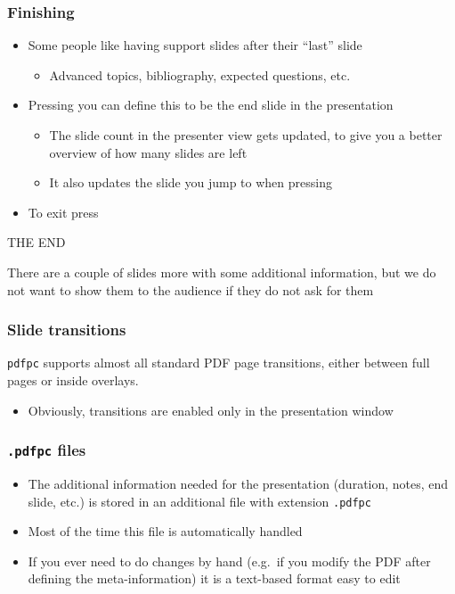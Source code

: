 \documentclass{beamer}
\newcommand{\singleitem}[1]{\begin{itemize}\item #1\end{itemize}}
\newcommand{\pdfpc}{\texttt{pdfpc}\xspace}
\newcommand{\opt}[1]{\texttt{#1}\xspace}
\begin{document}
\begin{frame}
  \frametitle{Finishing}
  \begin{itemize}
    \item Some people like having support slides after their ``last'' slide
      \singleitem{Advanced topics, bibliography, expected questions, etc.}
    \item Pressing  you can define this to be the end slide
      in the presentation
      \singleitem{The slide count in the presenter view gets updated, to give
        you a better overview of how many slides are left}
      \singleitem{It also updates the slide you jump to when pressing
        \keys{End}}
    \item To exit press 
  \end{itemize}
  \vfill
  \begin{center}
    THE END
  \end{center}
  \vfill
  {\footnotesize There are a couple of slides more with some additional
    information, but we do not want to show them to the audience if they do not
    ask for them}
\end{frame}

\begin{frame}
  \frametitle{Slide transitions}

  \pdfpc supports almost all standard PDF page transitions, either between full
  pages or inside overlays.

  \singleitem{Obviously, transitions are enabled only in the presentation
    window}


\end{frame}

\begin{frame}
  \transpush[direction=180]
  \frametitle{\opt{.pdfpc} files}
  \begin{itemize}
    \item The additional information needed for the presentation (duration,
      notes, end slide, etc.) is stored in an additional file with extension
      \opt{.pdfpc}
    \item Most of the time this file is automatically handled
    \item If you ever need to do changes by hand (e.g.\ if you modify the PDF
      after defining the meta-information) it is a text-based format easy to
      edit
  \end{itemize}
\end{frame}
\end{document}
